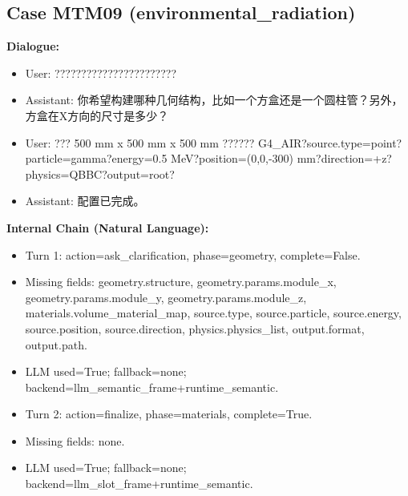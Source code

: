\documentclass[11pt]{ctexart}
\begin{document}
\subsection{Case MTM09 (environmental\_radiation)}
\textbf{Dialogue:}
\begin{itemize}
\item User: ???????????????????????
\item Assistant: 你希望构建哪种几何结构，比如一个方盒还是一个圆柱管？另外，方盒在X方向的尺寸是多少？
\item User: ??? 500 mm x 500 mm x 500 mm ?????? G4\_AIR?source.type=point?particle=gamma?energy=0.5 MeV?position=(0,0,-300) mm?direction=+z?physics=QBBC?output=root?
\item Assistant: 配置已完成。
\end{itemize}
\textbf{Internal Chain (Natural Language):}
\begin{itemize}
\item Turn 1: action=ask\_clarification, phase=geometry, complete=False.
\item Missing fields: geometry.structure, geometry.params.module\_x, geometry.params.module\_y, geometry.params.module\_z, materials.volume\_material\_map, source.type, source.particle, source.energy, source.position, source.direction, physics.physics\_list, output.format, output.path.
\item LLM used=True; fallback=none; backend=llm\_semantic\_frame+runtime\_semantic.
\item Turn 2: action=finalize, phase=materials, complete=True.
\item Missing fields: none.
\item LLM used=True; fallback=none; backend=llm\_slot\_frame+runtime\_semantic.
\end{itemize}
\end{document}
